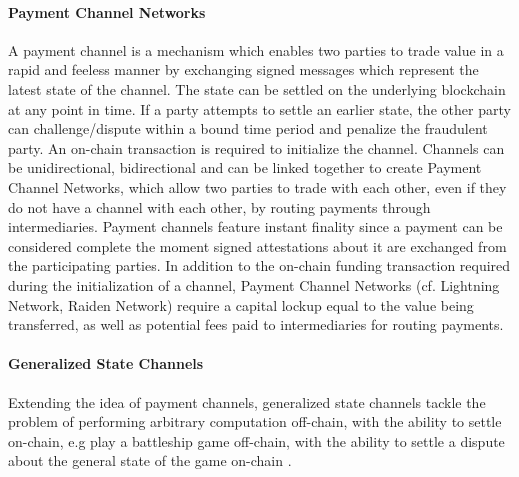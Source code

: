 \paragraph{Payment Channel Networks} A payment channel is a mechanism which
enables two parties to trade value in a rapid and feeless manner by exchanging signed messages which represent the latest state of the channel. The state can be settled on the underlying blockchain at any point in time. If a party attempts to settle an earlier state, the other party can challenge/dispute within a bound time period and penalize the fraudulent party. An on-chain transaction is required to initialize the channel. Channels can be unidirectional, bidirectional and can be linked together to create Payment Channel Networks, which allow two parties to trade with each other, even if they do not have a channel with each other, by routing payments through intermediaries. Payment channels feature instant finality since a payment can be considered complete the moment signed attestations about it are exchanged from the participating parties. In addition to the on-chain funding transaction required during the initialization of a channel, Payment Channel Networks (cf. Lightning Network, Raiden Network) require a capital lockup equal to the value being
transferred, as well as potential fees paid to intermediaries for routing payments. 

\paragraph{Generalized State Channels} Extending the idea of payment channels, generalized state channels tackle the problem of performing arbitrary computation off-chain, with the ability to settle on-chain, e.g play a battleship game off-chain, with the ability to settle a dispute about the general state of the game on-chain \cite{battleship, counterfactual}. 

% 

